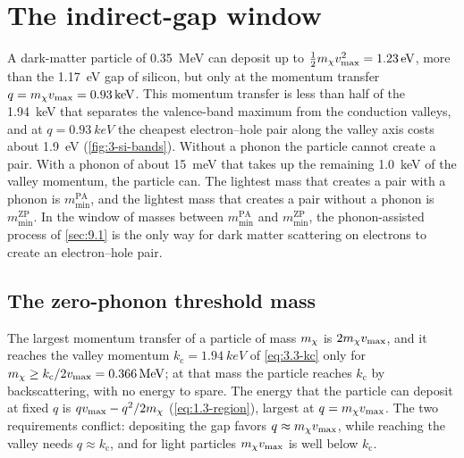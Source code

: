 \section{The indirect-gap window}\label{sec:13.1}

A dark-matter particle of \SI{0.35}{MeV} can deposit up to $\frac12m_{\chi} v_{\mathrm{max}}^2 = \SI{1.23}{eV}$, more than the \SI{1.17}{eV} gap of silicon, but only at the momentum transfer $q = m_{\chi} v_{\mathrm{max}} = \SI{0.93}{keV}$. This momentum transfer is less than half of the \SI{1.94}{keV} that separates the valence-band maximum from the conduction valleys, and at $q = \SI{0.93}{keV}$ the cheapest electron--hole pair along the valley axis costs about \SI{1.9}{eV} (\cref{fig:3-si-bands}). Without a phonon the particle cannot create a pair. With a phonon of about \SI{15}{meV} that takes up the remaining \SI{1.0}{keV} of the valley momentum, the particle can. The lightest mass that creates a pair with a phonon is $m_{\mathrm{min}}^{\mathrm{PA}}$, and the lightest mass that creates a pair without a phonon is $m_{\mathrm{min}}^{\mathrm{ZP}}$. In the window of masses between $m_{\mathrm{min}}^{\mathrm{PA}}$ and $m_{\mathrm{min}}^{\mathrm{ZP}}$, the phonon-assisted process of \cref{sec:9.1} is the only way for dark matter scattering on electrons to create an electron--hole pair.

\subsection{The zero-phonon threshold mass}

The largest momentum transfer of a particle of mass $m_{\chi}$ is $2m_{\chi} v_{\mathrm{max}}$, and it reaches the valley momentum $k_{\mathrm{c}} = \SI{1.94}{keV}$ of \cref{eq:3.3-kc} only for $m_{\chi} \ge k_{\mathrm{c}}/2v_{\mathrm{max}} = \SI{0.366}{MeV}$; at that mass the particle reaches $k_{\mathrm{c}}$ by backscattering, with no energy to spare. The energy that the particle can deposit at fixed $q$ is $qv_{\mathrm{max}} - q^2/2m_{\chi}$ (\cref{eq:1.3-region}), largest at $q = m_{\chi} v_{\mathrm{max}}$. The two requirements conflict: depositing the gap favors $q \approx m_{\chi} v_{\mathrm{max}}$, while reaching the valley needs $q \approx k_{\mathrm{c}}$, and for light particles $m_{\chi} v_{\mathrm{max}}$ is well below $k_{\mathrm{c}}$.

